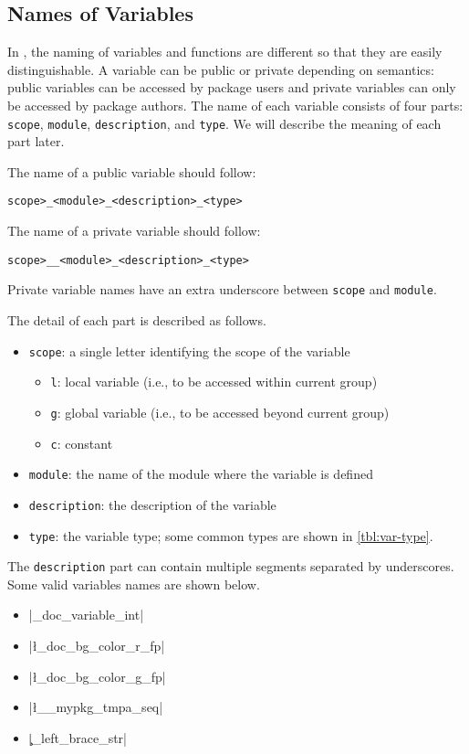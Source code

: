 \documentclass{ltugboat}
\begin{document}
\subsection{Names of Variables}\label{sec:name-of-variables}

In \LTT{}, the naming of variables and functions are different so that they are easily distinguishable. 
A \LTT{} variable can be public or private depending on semantics: public variables can be accessed by package users and private variables can only be accessed by package authors.
The name of each \LTT{} variable consists of four parts: \texttt{scope}, \texttt{module}, \texttt{description}, and \texttt{type}. 
We will describe the meaning of each part later.


\vspace*{0.5\baselineskip}
\par\noindent The name of a public variable should follow:
\begin{center}
\texttt{\string\<scope>\_<module>\_<description>\_<type>}
\end{center}
The name of a private variable should follow:
\begin{center}
\texttt{\string\<scope>\_\_<module>\_<description>\_<type>}
\end{center}
Private variable names have an extra underscore between \texttt{scope} and \texttt{module}.

\vspace*{0.5\baselineskip}
\par\noindent The detail of each part is described as follows.
\begin{itemize}
\item \texttt{scope}: a single letter identifying the scope of the variable
\begin{itemize}
\item \texttt{l}: local variable (i.e., to be accessed within current group)
\item \texttt{g}: global variable (i.e., to be accessed beyond current group)
\item \texttt{c}: constant
\end{itemize}
\item \texttt{module}: the name of the module where the variable is defined
\item \texttt{description}: the description of the variable
\item \texttt{type}: the variable type; some common types are shown in \cref{tbl:var-type}.
\end{itemize}
The \texttt{description} part can contain multiple segments separated by underscores. 
Some valid variables names are shown below.
\begin{itemize}
\item \inltex|\g_doc_variable_int|
\item \inltex|\l_doc_bg_color_r_fp|
\item \inltex|\l_doc_bg_color_g_fp|
\item \inltex|\l__mypkg_tmpa_seq|
\item \inltex|\c_left_brace_str|
\end{itemize}
\end{document}
